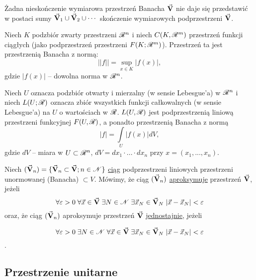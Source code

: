 \begin{info}
   Żadna nieskończenie wymiarowa przestrzeń Banacha $\vec{\mathbf{V}}$ nie daje się przedstawić w postaci sumy $\vec{\mathbf{V}}_1 \cup \vec{\mathbf{V}}_2 \cup \cdots$ skończenie wymiarowych podprzestrzeni $\vec{\mathbf{V}}$.
\end{info}

\begin{example}
   Niech $K$ podzbiór zwarty przestrzeni $\mathscr{R}^n$ i niech $C(K, \mathscr{R}^m)$ przestrzeń funkcji ciągłych (jako podprzestrzeń przestrzeni $F(K; \mathscr{R}^m)$). Przestrzeń ta jest przestrzenią Banacha z normą:
   \[||f|| = \sup\limits_{x \in K} |f(x)|,\]
   gdzie $|f(x)|$ -- dowolna norma w $\mathscr{R}^n$.
\end{example}

\begin{example}
   Niech $U$ oznacza podzbiór otwarty i mierzalny (w sensie Lebesgue'a) w $\mathscr{R}^n$ i niech $L(U; \mathscr{R})$ oznacza zbiór wszystkich funkcji całkowalnych (w sensie Lebesgue'a) na $U$  o wartościach w $\mathscr{R}$. $L(U,\mathscr{R})$ jest podprzestrzenią liniową przestrzeni funkcyjnej $F(U, \mathscr{R})$, a ponadto przestrzenią Banacha z normą
   \[|f| = \int\limits_U |f(x)| dV,\]
   gdzie $dV$ -- miara w $U \subset \mathscr{R}^n$, $d V = dx_1 \cdot 
   ... \cdot dx_n$ przy $x = (x_1, ..., x_n)$.
\end{example}

\begin{mydef}
   Niech $(\vec{\mathbf{V}}_n) = \{\vec{\mathbf{V}}_n \subset \vec{\mathbf{V}}; n \in \mathscr{N}\}$ \underline{ciąg} podprzestrzeni liniowych przestrzeni unormowanej (Banacha) $\subset{V}$.
   Mówimy, że ciąg $(\vec{\mathbf{V}}_n)$ \underline{aproksymuje} przestrzeń $\vec{\mathbf{V}}$, jeżeli
   \[\forall \varepsilon > 0 \; \forall \vec{x} \in \vec{\mathbf{V}} \; \exists N \in \mathscr{N} \; \exists \vec{x}_N \in \vec{\mathbf{V}}_N \; |\vec{x}-\vec{x}_N| < \varepsilon\]
   oraz, że ciąg $(\vec{\mathbf{V}}_n)$ aproksymuje przestrzeń $\vec{\mathbf{V}}$ \underline{jednostajnie}, jeżeli

   \[\forall \varepsilon > 0 \; \exists N \in \mathscr{N} \; \forall \vec{x} \in \vec{\mathbf{V}} \; \exists \vec{x}_N \in \vec{\mathbf{V}}_N \; |\vec{x} - \vec{x}_N| < \varepsilon\].
\end{mydef}


\subsection{Przestrzenie unitarne}

